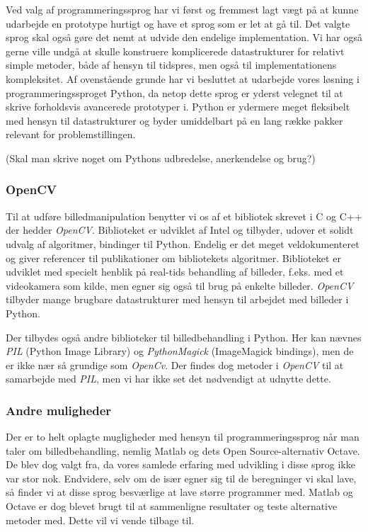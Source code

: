 {
Ved valg af programmeringssprog har vi først og fremmest lagt vægt på at
kunne udarbejde en prototype hurtigt og have et sprog som er let at gå
til. Det valgte sprog skal også gøre det nemt at udvide den endelige
implementation. Vi har også gerne ville undgå at skulle konstruere
komplicerede datastrukturer for relativt simple metoder, både af hensyn
til tidspres, men også til implementationens kompleksitet. Af
ovenstående grunde har vi besluttet at udarbejde vores løsning i
programmeringssproget Python, da netop dette sprog er yderst velegnet
til at skrive forholdsvis avancerede prototyper i. Python er
ydermere meget fleksibelt med hensyn til datastrukturer og byder
umiddelbart på en lang række pakker relevant for problemstillingen.

(Skal man skrive noget om Pythons udbredelse, anerkendelse og brug?)

\subsubsection*{OpenCV}
Til at udføre billedmanipulation benytter vi os af et bibliotek skrevet
i C og C++ der hedder \emph{OpenCV}. Biblioteket er udviklet af Intel og
tilbyder, udover et solidt udvalg af algoritmer, bindinger til Python.
Endelig er det meget veldokumenteret og giver referencer til
publikationer om bibliotekets algoritmer. Biblioteket er udviklet med
specielt henblik på real-tids behandling af billeder, f.eks. med et
videokamera som kilde, men egner sig også til brug på enkelte billeder.
\emph{OpenCV} tilbyder mange brugbare datastrukturer med hensyn til
arbejdet med billeder i Python.

Der tilbydes også andre biblioteker til billedbehandling i Python. Her
kan nævnes \emph{PIL} (Python Image Library) og \emph{PythonMagick}
(ImageMagick bindings), men de er ikke nær så grundige som
\emph{OpenCv}. Der findes dog metoder i \emph{OpenCV} til at samarbejde
med \emph{PIL}, men vi har ikke set det nødvendigt at udnytte dette.


\subsubsection{Andre muligheder}
Der er to helt oplagte mugligheder med hensyn til programmeringssprog
når man taler om billedbehandling, nemlig Matlab og dets Open
Source-alternativ Octave. De blev dog valgt fra, da vores samlede
erfaring med udvikling i disse sprog ikke var stor nok. Endvidere, selv
om de især egner sig til de beregninger vi skal lave, så finder vi at
disse sprog besværlige at lave større programmer med. Matlab og Octave
er dog blevet brugt til at sammenligne resultater og teste alternative
metoder med. Dette vil vi vende tilbage til.

}
